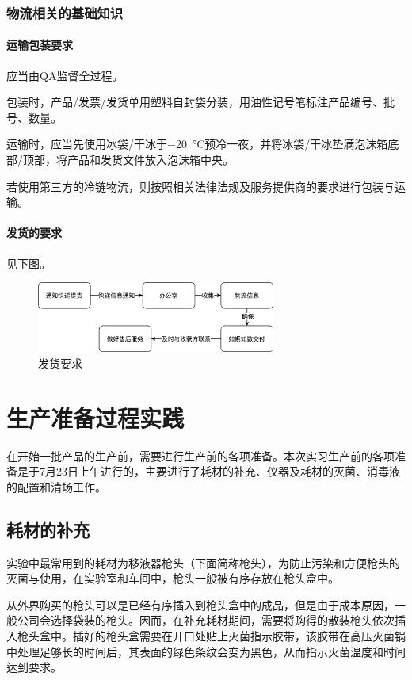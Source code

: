 \documentclass[cn,black,12pt,normal]{elegantnote}
\begin{document}
\subsubsection{物流相关的基础知识}

\paragraph{运输包装要求} 应当由QA监督全过程。

包装时，产品/发票/发货单用塑料自封袋分装，用油性记号笔标注产品编号、批号、数量。

运输时，应当先使用冰袋/干冰­于\SI{-20}{\celsius}预冷一夜，并将冰袋/干冰垫满泡沫箱底部/顶部，将产品和发货文件放入泡沫箱中央。

若使用第三方的冷链物流，则按照相关法律法规及服务提供商的要求进行包装与运输。

\paragraph{发货的要求} 见下图。

\begin{figure}[H]
    \centering
    \includegraphics[width=0.7\textwidth]{image/Transport.png}
    \caption{发货要求}
    \label{TR}
\end{figure}

\section{生产准备过程实践}

在开始一批产品的生产前，需要进行生产前的各项准备。本次实习生产前的各项准备是于7月23日上午进行的，主要进行了耗材的补充、仪器及耗材的灭菌、消毒液的配置和清场工作。

\subsection{耗材的补充}
实验中最常用到的耗材为移液器枪头（下面简称枪头），为防止污染和方便枪头的灭菌与使用，在实验室和车间中，枪头一般被有序存放在枪头盒中。

从外界购买的枪头可以是已经有序插入到枪头盒中的成品，但是由于成本原因，一般公司会选择袋装的枪头。因而，在补充耗材期间，需要将购得的散装枪头依次插入枪头盒中。插好的枪头盒需要在开口处贴上灭菌指示胶带，该胶带在高压灭菌锅中处理足够长的时间后，其表面的绿色条纹会变为黑色，从而指示灭菌温度和时间达到要求。
\end{document}
